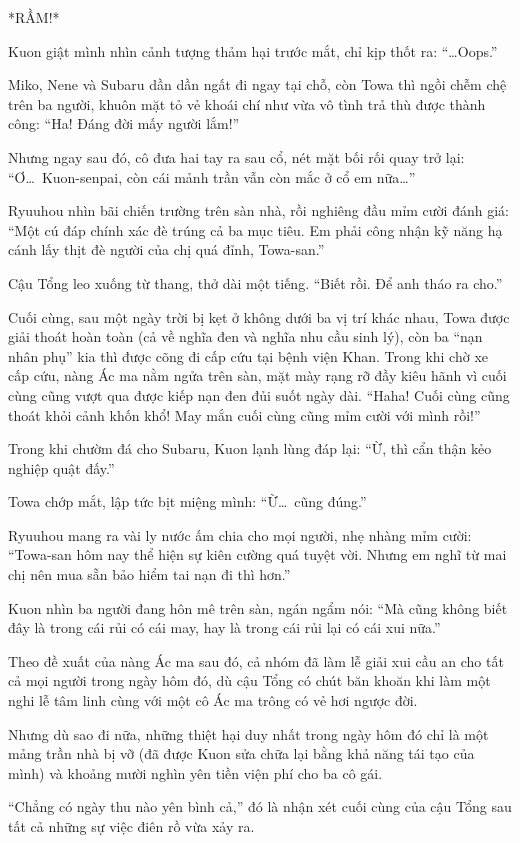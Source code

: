 \documentclass[../main.tex]{subfiles}
\begin{document}
*RẦM!*

Kuon giật mình nhìn cảnh tượng thảm hại trước mắt, chỉ kịp thốt ra: ``\dots Oops.''

Miko, Nene và Subaru dần dần ngất đi ngay tại chỗ, còn Towa thì ngồi chễm chệ trên ba người, khuôn mặt tỏ vẻ khoái chí như vừa vô tình trả thù được thành công: ``Ha! Đáng đời mấy người lắm!''

Nhưng ngay sau đó, cô đưa hai tay ra sau cổ, nét mặt bối rối quay trở lại: ``Ơ\dots\ Kuon-senpai, còn cái mảnh trần vẫn còn mắc ở cổ em nữa\dots''

Ryuuhou nhìn bãi chiến trường trên sàn nhà, rồi nghiêng đầu mỉm cười đánh giá: ``Một cú đáp chính xác đè trúng cả ba mục tiêu. Em phải công nhận kỹ năng hạ cánh lấy thịt đè người của chị quá đỉnh, Towa-san.''

Cậu Tổng leo xuống từ thang, thở dài một tiếng. ``Biết rồi. Để anh tháo ra cho.''

\ct

Cuối cùng, sau một ngày trời bị kẹt ở không dưới ba vị trí khác nhau, Towa được giải thoát hoàn toàn (cả về nghĩa đen và nghĩa nhu cầu sinh lý), còn ba ``nạn nhân phụ'' kia thì được cõng đi cấp cứu tại bệnh viện Khan. Trong khi chờ xe cấp cứu, nàng Ác ma nằm ngửa trên sàn, mặt mày rạng rỡ đầy kiêu hãnh vì cuối cùng cũng vượt qua được kiếp nạn đen đủi suốt ngày dài. ``Haha! Cuối cùng cũng thoát khỏi cảnh khốn khổ! May mắn cuối cùng cũng mỉm cười với mình rồi!''

Trong khi chườm đá cho Subaru, Kuon lạnh lùng đáp lại: ``Ừ, thì cẩn thận kẻo nghiệp quật đấy.''

Towa chớp mắt, lập tức bịt miệng mình: ``Ừ\dots\ cũng đúng.''

Ryuuhou mang ra vài ly nước ấm chia cho mọi người, nhẹ nhàng mỉm cười: ``Towa-san hôm nay thể hiện sự kiên cường quá tuyệt vời. Nhưng em nghĩ từ mai chị nên mua sẵn bảo hiểm tai nạn đi thì hơn.''

Kuon nhìn ba người đang hôn mê trên sàn, ngán ngẩm nói: ``Mà cũng không biết đây là trong cái rủi có cái may, hay là trong cái rủi lại có cái xui nữa.''

Theo đề xuất của nàng Ác ma sau đó, cả nhóm đã làm lễ giải xui cầu an cho tất cả mọi người trong ngày hôm đó, dù cậu Tổng có chút băn khoăn khi làm một nghi lễ tâm linh cùng với một cô Ác ma trông có vẻ hơi ngược đời.

Nhưng dù sao đi nữa, những thiệt hại duy nhất trong ngày hôm đó chỉ là một mảng trần nhà bị vỡ (đã được Kuon sửa chữa lại bằng khả năng tái tạo của mình) và khoảng mười nghìn yên tiền viện phí cho ba cô gái.

``Chẳng có ngày thu nào yên bình cả,'' đó là nhận xét cuối cùng của cậu Tổng sau tất cả những sự việc điên rồ vừa xảy ra.
\end{document}
